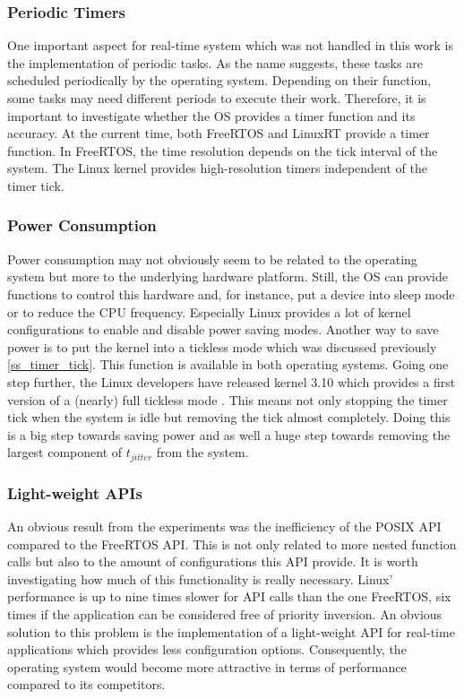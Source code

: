 \subsubsection{Periodic Timers}
One important aspect for real-time system which was not handled in this work is the implementation of periodic tasks.
As the name suggests, these tasks are scheduled periodically by the operating system.
Depending on their function, some tasks may need different periods to execute their work.
Therefore, it is important to investigate whether the \ac{OS} provides a timer function and its accuracy.
At the current time, both FreeRTOS and LinuxRT provide a timer function.
In FreeRTOS, the time resolution depends on the tick interval of the system.
The Linux kernel provides high-resolution timers independent of the timer tick.

\subsubsection{Power Consumption}
Power consumption may not obviously seem to be related to the operating system but more to the underlying hardware platform.
Still, the \ac{OS} can provide functions to control this hardware and, for instance, put a device into sleep mode or to reduce the \ac{CPU} frequency.
Especially Linux provides a lot of kernel configurations to enable and disable power saving modes.
Another way to save power is to put the kernel into a tickless mode which was discussed previously \ref{ss_timer_tick}.
This function is available in both operating systems.
Going one step further, the Linux developers have released kernel 3.10 which provides a first version of a (nearly) full tickless mode \cite{corbet:nftoi}.
This means not only stopping the timer tick when the system is idle but removing the tick almost completely. 
Doing this is a big step towards saving power and as well a huge step towards removing the largest component of $t_{jitter}$ from the system.

\subsubsection{Light-weight APIs}
An obvious result from the experiments was the inefficiency of the POSIX \ac{API} compared to the FreeRTOS \ac{API}.
This is not only related to more nested function calls but also to the amount of configurations this \ac{API} provide.
It is worth investigating how much of this functionality is really necessary.
Linux' performance is up to nine times slower for \ac{API} calls than the one FreeRTOS, six times if the application can be considered free of priority inversion.
An obvious solution to this problem is the implementation of a light-weight \ac{API} for real-time applications which provides less configuration options.
Consequently, the operating system would become more attractive in terms of performance compared to its competitors.